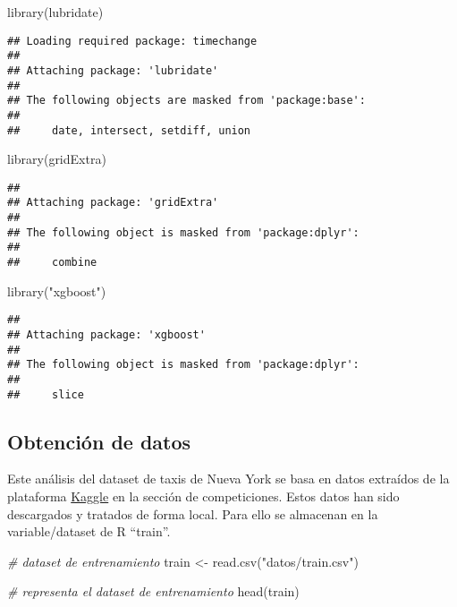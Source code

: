 \documentclass[
]{article}
\newenvironment{Shaded}{\begin{snugshade}}{\end{snugshade}}
\newcommand{\CommentTok}[1]{\textcolor[rgb]{0.56,0.35,0.01}{\textit{#1}}}
\newcommand{\FunctionTok}[1]{\textcolor[rgb]{0.00,0.00,0.00}{#1}}
\newcommand{\NormalTok}[1]{#1}
\newcommand{\OtherTok}[1]{\textcolor[rgb]{0.56,0.35,0.01}{#1}}
\newcommand{\StringTok}[1]{\textcolor[rgb]{0.31,0.60,0.02}{#1}}
\begin{document}
\begin{Shaded}
\begin{Highlighting}[]
\FunctionTok{library}\NormalTok{(lubridate)}
\end{Highlighting}
\end{Shaded}

\begin{verbatim}
## Loading required package: timechange
## 
## Attaching package: 'lubridate'
## 
## The following objects are masked from 'package:base':
## 
##     date, intersect, setdiff, union
\end{verbatim}

\begin{Shaded}
\begin{Highlighting}[]
\FunctionTok{library}\NormalTok{(gridExtra)}
\end{Highlighting}
\end{Shaded}

\begin{verbatim}
## 
## Attaching package: 'gridExtra'
## 
## The following object is masked from 'package:dplyr':
## 
##     combine
\end{verbatim}

\begin{Shaded}
\begin{Highlighting}[]
\FunctionTok{library}\NormalTok{(}\StringTok{"xgboost"}\NormalTok{)}
\end{Highlighting}
\end{Shaded}

\begin{verbatim}
## 
## Attaching package: 'xgboost'
## 
## The following object is masked from 'package:dplyr':
## 
##     slice
\end{verbatim}

\hypertarget{obtenciuxf3n-de-datos}{%
\subsection{Obtención de datos}\label{obtenciuxf3n-de-datos}}

Este análisis del dataset de taxis de Nueva York se basa en datos
extraídos de la plataforma
\href{https://www.kaggle.com/competitions/nyc-taxi-trip-duration/data}{Kaggle}
en la sección de competiciones. Estos datos han sido descargados y
tratados de forma local. Para ello se almacenan en la variable/dataset
de R ``train''.

\begin{Shaded}
\begin{Highlighting}[]
\CommentTok{\# dataset de entrenamiento}
\NormalTok{train }\OtherTok{\textless{}{-}} \FunctionTok{read.csv}\NormalTok{(}\StringTok{"datos/train.csv"}\NormalTok{)}

\CommentTok{\# representa el dataset de entrenamiento}
\FunctionTok{head}\NormalTok{(train)}
\end{Highlighting}
\end{Shaded}
\end{document}
